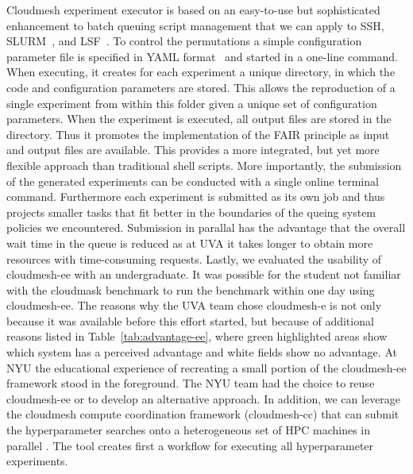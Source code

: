 \documentclass[sigplan,screen]{acmart}
\begin{document}
Cloudmesh experiment executor is based on an easy-to-use but sophisticated enhancement to batch queuing script management that we can apply to SSH, SLURM~\cite{www-slurm}, and LSF~\cite{www-lsf}. To control the permutations a simple configuration parameter file is specified in YAML format~\cite{github-cloudmesh-ee} and started in a one-line command. 
When executing, it creates for each experiment a unique directory, in which the code and configuration parameters are stored. This allows the reproduction of a single experiment from within this folder given a unique set of configuration parameters. When the experiment is executed, all output files are stored in the directory. Thus it promotes the implementation of the FAIR principle as input and output files are available.
This provides a more integrated, but yet more flexible approach than traditional shell scripts. More importantly, the submission of the generated experiments can be conducted with a single online terminal command. 
Furthermore each experiment is submitted as its own job and thus projects smaller tasks that fit better in the boundaries of the queing system policies we encountered. Submission in parallal has the advantage that the overall wait time in the queue is reduced as at UVA it takes longer to obtain more resources with time-consuming requests. Lastly, we evaluated the usability of cloudmesh-ee with an undergraduate. It was possible for the student not familiar with the cloudmask benchmark to run the benchmark within one day \cite{las-2023-escience-cloudmask} using cloudmesh-ee.
The reasons why the UVA team chose cloudmesh-e is not only because it was available before this effort started, but because of additional reasons listed in Table~\ref{tab:advantage-ee}, where green highlighted areas show which system has a perceived advantage and white fields show no advantage. At NYU the educational experience of recreating a small portion of the cloudmesh-ee framework stood in the foreground. The NYU team had the choice to reuse cloudmesh-ee or to develop an alternative approach.
In addition, we can leverage the cloudmesh compute coordination framework (cloudmesh-cc) that can submit the hyperparameter searches onto a heterogeneous set of HPC machines in parallel \cite{las-2023-ai-workflow,github-cloudmesh-cc,las22-cloudmesh-cc-reu}. The tool creates first a workflow for executing all hyperparameter experiments. 


\newcommand{\OK}{\cellcolor{green!10}}
\newcommand{\GR}{\cellcolor{gray!10}}
\end{document}
